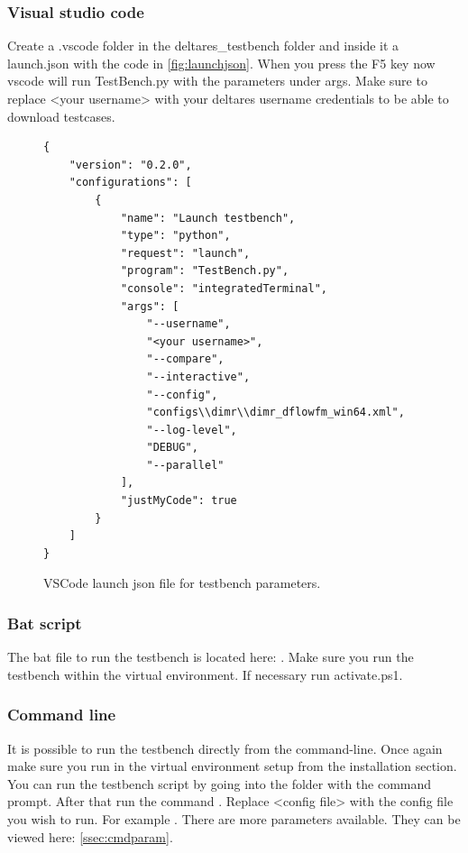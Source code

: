 \documentclass{deltares_memo}
\begin{document}
\subsubsection{Visual studio code}
\label{sssec:vscodelaunch}
Create a .vscode folder in the deltares\_testbench folder and inside it a launch.json with the code in \autoref{fig:launchjson}.
When you press the F5 key now vscode will run TestBench.py with the parameters under args. Make sure to replace <your username> with your deltares username credentials to be able to download testcases.
\begin{figure}[H]
\centering
\begin{lstlisting}[style=json]
{
    "version": "0.2.0",
    "configurations": [
        {
            "name": "Launch testbench",
            "type": "python",
            "request": "launch",
            "program": "TestBench.py",
            "console": "integratedTerminal",
            "args": [
                "--username",
                "<your username>",
                "--compare",
                "--interactive",
                "--config",
                "configs\\dimr\\dimr_dflowfm_win64.xml",
                "--log-level",
                "DEBUG",
                "--parallel"
            ],
            "justMyCode": true
        }
    ]
}
\end{lstlisting}
\caption{VSCode launch json file for testbench parameters.}
\label{fig:launchjson}
\end{figure}

\subsubsection{Bat script}
\label{sssec:batrun}
The bat file to run the testbench is located here: . Make sure you run the testbench within the virtual environment. If necessary run activate.ps1.

\subsubsection{Command line}
\label{sssec:commandrun}
It is possible to run the testbench directly from the command-line. Once again make sure you run in the virtual environment setup from the installation section.
You can run the testbench script by going into the  folder with the command prompt. After that run the command . Replace <config file> with the config file you wish to run. For example . There are more parameters available. They can be viewed here: \autoref{ssec:cmdparam}.
\end{document}

